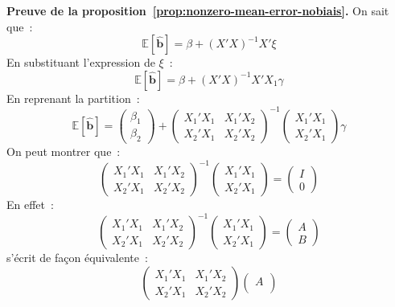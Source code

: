 \documentclass[10pt]{beamer}
\begin{document}
\begin{notes}

  \textbf{Preuve de la proposition~\ref{prop:nonzero-mean-error-nobiais}.} On sait que~:
  \[
    \mathbb E\left[ \hat{\mathbf b} \right] = \beta + (X'X)^{-1}X'\xi
  \]
  En substituant l'expression de $\xi$~:
  \[
    \mathbb E\left[ \hat{\mathbf b} \right] = \beta + (X'X)^{-1}X'X_1\gamma
  \]
  En reprenant la partition~:
  \[
    \mathbb E\left[ \hat{\mathbf b} \right] =
    \begin{pmatrix}
      \beta_1\\ \beta_2
    \end{pmatrix}
    +
    \begin{pmatrix}
      X_1'X_1 & X_1'X_2\\
      X_2'X_1 & X_2'X_2
    \end{pmatrix}^{-1}
    \begin{pmatrix}
      X_1'X_1\\
      X_2'X_1
    \end{pmatrix}\gamma
  \]
  On peut montrer que~:
  \[
\begin{pmatrix}
      X_1'X_1 & X_1'X_2\\
      X_2'X_1 & X_2'X_2
    \end{pmatrix}^{-1}
    \begin{pmatrix}
      X_1'X_1\\
      X_2'X_1
    \end{pmatrix} =
    \begin{pmatrix}
      I\\
      0
    \end{pmatrix}
  \]
  En effet~:
  \[
    \begin{pmatrix}
      X_1'X_1 & X_1'X_2\\
      X_2'X_1 & X_2'X_2
    \end{pmatrix}^{-1}
    \begin{pmatrix}
      X_1'X_1\\
      X_2'X_1
    \end{pmatrix} =
    \begin{pmatrix}
      A\\
      B
    \end{pmatrix}
  \]
  s'écrit de façon équivalente~:
  \[
\begin{pmatrix}
      X_1'X_1 & X_1'X_2\\
      X_2'X_1 & X_2'X_2
\end{pmatrix}
\begin{pmatrix}
      A\\

\end{pmatrix}\]
\end{notes}
\end{document}
